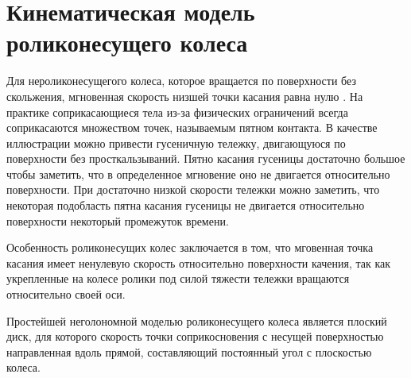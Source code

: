 \documentclass[oneside,final,14pt]{extreport}
\newcommand{\cmmnt}[1]{\ignorespaces}
\begin{document}
\chapter{Кинематическая модель роликонесущего колеса} 
\label{chap:MecanumWheelModel}
Для нероликонесущегого колеса, которое вращается по поверхности без скольжения, мгновенная скорость низшей точки касания равна нулю \cite{MecanumWheel}. На практике соприкасающиеся тела из-за физических ограничений всегда соприкасаются множеством точек, называемым пятном контакта. В качестве иллюстрации можно привести гусеничную тележку, двигающуюся по поверхности без просткальзываний. Пятно касания гусеницы достаточно большое чтобы заметить, что в определенное мгновение оно не двигается относительно поверхности. При достаточно низкой скорости тележки можно заметить, что некоторая подобласть пятна касания гусеницы не двигается относительно поверхности некоторый промежуток времени. 

Особенность роликонесущих колес заключается в том, что мговенная точка касания имеет ненулевую скорость относительно поверхности качения, так как укрепленные на колесе ролики под силой тяжести тележки вращаются относительно своей оси. \cmmnt{В случае всенаправленного колеса, оси роликов которого параллельны плоскости диска колеса, проскальзывания не происходит, что упрощает процесс построения математической модели}

 Простейшей неголономной моделью роликонесущего колеса является плоский диск, для которого скорость точки соприкосновения с несущей поверхностью направленная вдоль прямой, составляющий постоянный угол с плоскостью колеса.

\begin{figure}[H]
\end{figure}

\begin{figure}[H]
\end{figure}
\end{document}
